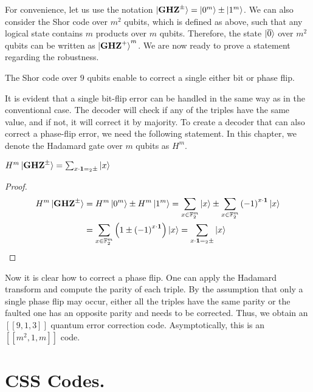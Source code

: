 For convenience, let us use the notation $\ket{\mathbf{GHZ}^{\pm}} =  \ket{0^{m}} \pm  \ket{1^{m}}$. We can also consider the Shor code over $m^{2}$ qubits, which is defined as above, such that any logical state contains $m$ products over $m$ qubits. Therefore, the state $\ket{\overline{0}}$ over $m^{2}$ qubits can be written as $\ket{\mathbf{GHZ}^{+}}^{m}$. We are now ready to prove a statement regarding the robustness.
\begin{lemma}
  The Shor code over $9$ qubits enable to correct a single either bit or phase flip.  
\end{lemma}
It is evident that a single bit-flip error can be handled in the same way as in the conventional case. The decoder will check if any of the triples have the same value, and if not, it will correct it by majority. To create a decoder that can also correct a phase-flip error, we need the following statement. In this chapter, we denote the Hadamard gate over $m$ qubits as $H^m$.
\begin{claim}
   $H^{m}\ket{\mathbf{GHZ}^{\pm}} = \sum_{ x \cdot \mathbf{1} =_2 \pm }{\ket{x} }$
\end{claim}

\begin{proof}

  \begin{equation*}
    \begin{split}
      H^{m}\ket{\mathbf{GHZ}^{\pm}} & = H^{m}\ket{0^{m}} \pm  H^{m}\ket{1^{m}} = \sum_{x \in \mathbb{F}_{2}^{m}}{\ket{x}} \pm  \sum_{x \in \mathbb{F}_{2}^{m}}{\left( -1 \right)^{x \cdot \mathbf{1}} \ket{x}} \\ & = \sum_{x \in \mathbb{F}_{2}^{m}}{ \left( 1 \pm \left( -1 \right)^{x \cdot \mathbf{1}}  \right) \ket{x} } =  \sum_{x \cdot \mathbf{1} =_2 \pm }{\ket{x} }
    \end{split}
  \end{equation*}
\end{proof}

Now it is clear how to correct a phase flip. One can apply the Hadamard transform and compute the parity of each triple. By the assumption that only a single phase flip may occur, either all the triples have the same parity or the faulted one has an opposite parity and needs to be corrected. Thus, we obtain an $\left[ \left[ 9,1,3 \right] \right]$ quantum error correction code. Asymptotically, this is an $\left[ \left[ m^{2}, 1, m \right] \right]$ code.

\section{CSS Codes.}

